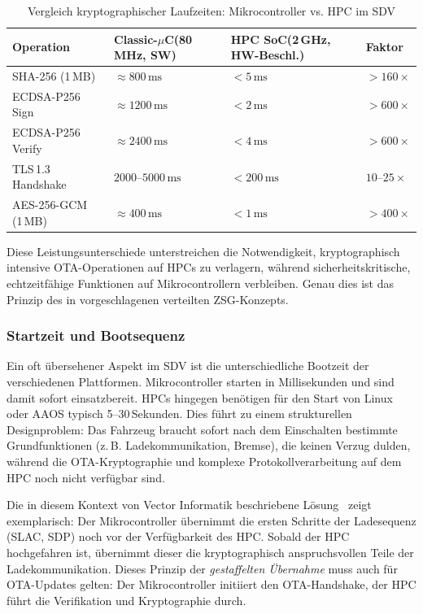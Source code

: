 ﻿\documentclass[12pt,a4paper,twoside]{article}
\begin{document}
\begin{table}[htbp]
  \centering
  \caption{Vergleich kryptographischer Laufzeiten: Mikrocontroller vs. HPC im SDV}
  \label{tab:crypto_perf}
  \begin{tabularx}{\textwidth}{lXXX}
    \toprule
    \textbf{Operation} & \textbf{Classic-$\mu$C\newline(80\,MHz, SW)} &
      \textbf{HPC SoC\newline(2\,GHz, HW-Beschl.)} & \textbf{Faktor} \\
    \midrule
    SHA-256 (1\,MB) & $\approx 800\,\text{ms}$ & $<5\,\text{ms}$ & $>160\times$ \\
    ECDSA-P256 Sign & $\approx 1200\,\text{ms}$ & $<2\,\text{ms}$ & $>600\times$ \\
    ECDSA-P256 Verify & $\approx 2400\,\text{ms}$ & $<4\,\text{ms}$ & $>600\times$ \\
    TLS\,1.3 Handshake & $2000$--$5000\,\text{ms}$ & $<200\,\text{ms}$ & $10$--$25\times$ \\
    AES-256-GCM (1\,MB) & $\approx 400\,\text{ms}$ & $<1\,\text{ms}$ & $>400\times$ \\
    \bottomrule
  \end{tabularx}
\end{table}

Diese Leistungsunterschiede unterstreichen die Notwendigkeit, kryptographisch
intensive OTA-Operationen auf HPCs zu verlagern, während sicherheitskritische,
echtzeitfähige Funktionen auf Mikrocontrollern verbleiben. Genau dies ist das
Prinzip des in  vorgeschlagenen verteilten ZSG-Konzepts.

\subsubsection{Startzeit und Bootsequenz}

Ein oft übersehener Aspekt im SDV ist die unterschiedliche Bootzeit der
verschiedenen Plattformen. Mikrocontroller starten in Millisekunden und sind
damit sofort einsatzbereit. HPCs hingegen benötigen für den Start von Linux
oder AAOS typisch 5--30\,Sekunden. Dies führt zu einem strukturellen Designproblem:
Das Fahrzeug braucht sofort nach dem Einschalten bestimmte Grundfunktionen
(z.\,B. Ladekommunikation, Bremse), die keinen Verzug dulden, während die
OTA-Kryptographie und komplexe Protokollverarbeitung auf dem HPC noch nicht
verfügbar sind.

Die in diesem Kontext von Vector Informatik beschriebene Lösung~\cite{schneider2026ladekomm}
zeigt exemplarisch: Der Mikrocontroller übernimmt die ersten Schritte der
Ladesequenz (SLAC, SDP) noch vor der Verfügbarkeit des HPC. Sobald der HPC
hochgefahren ist, übernimmt dieser die kryptographisch anspruchsvollen Teile
der Ladekommunikation. Dieses Prinzip der \emph{gestaffelten Übernahme} muss
auch für OTA-Updates gelten: Der Mikrocontroller initiiert den OTA-Handshake,
der HPC führt die Verifikation und Kryptographie durch.
\end{document}
